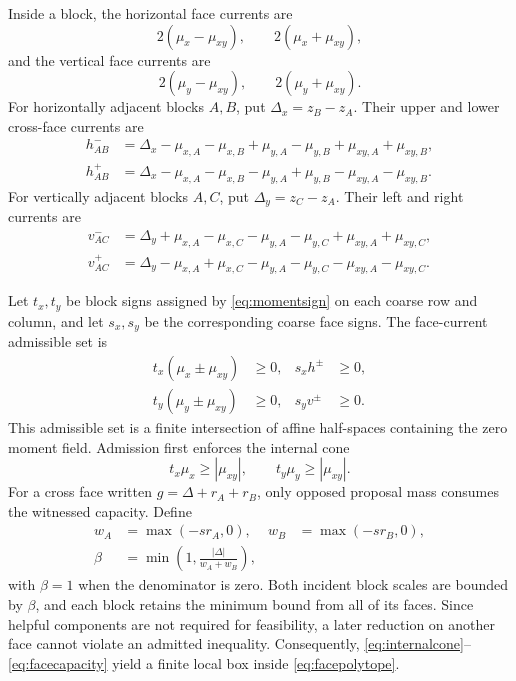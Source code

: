 Inside a block, the horizontal face currents are
\begin{equation}
 2(\mu_x-\mu_{xy}),\qquad2(\mu_x+\mu_{xy}),
 \label{eq:internalhorizontal}
\end{equation}
and the vertical face currents are
\begin{equation}
 2(\mu_y-\mu_{xy}),\qquad2(\mu_y+\mu_{xy}).
 \label{eq:internalvertical}
\end{equation}
For horizontally adjacent blocks \(A,B\), put \(\Delta_x=z_B-z_A\). Their
upper and lower cross-face currents are
\begin{align}
 h^-_{AB}&=\Delta_x-\mu_{x,A}-\mu_{x,B}
 +\mu_{y,A}-\mu_{y,B}+\mu_{xy,A}+\mu_{xy,B},\nonumber\\
 h^+_{AB}&=\Delta_x-\mu_{x,A}-\mu_{x,B}
 -\mu_{y,A}+\mu_{y,B}-\mu_{xy,A}-\mu_{xy,B}.
 \label{eq:horizontalfaces}
\end{align}
For vertically adjacent blocks \(A,C\), put \(\Delta_y=z_C-z_A\). Their
left and right currents are
\begin{align}
 v^-_{AC}&=\Delta_y+\mu_{x,A}-\mu_{x,C}
 -\mu_{y,A}-\mu_{y,C}+\mu_{xy,A}+\mu_{xy,C},\nonumber\\
 v^+_{AC}&=\Delta_y-\mu_{x,A}+\mu_{x,C}
 -\mu_{y,A}-\mu_{y,C}-\mu_{xy,A}-\mu_{xy,C}.
 \label{eq:verticalfaces}
\end{align}

Let \(t_x,t_y\) be block signs assigned by \eqref{eq:momentsign} on each
coarse row and column, and let \(s_x,s_y\) be the corresponding coarse face
signs. The face-current admissible set is
\begin{equation}
\begin{aligned}
 t_x(\mu_x\pm\mu_{xy})&\geq0,&s_xh^\pm&\geq0,\\
 t_y(\mu_y\pm\mu_{xy})&\geq0,&s_yv^\pm&\geq0.
\end{aligned}
 \label{eq:facepolytope}
\end{equation}
This admissible set is a finite intersection of affine half-spaces containing
the zero moment field. Admission first enforces the internal cone
\begin{equation}
 t_x\mu_x\geq|\mu_{xy}|,\qquad
 t_y\mu_y\geq|\mu_{xy}|.
 \label{eq:internalcone}
\end{equation}
For a cross face written \(g=\Delta+r_A+r_B\), only opposed proposal mass
consumes the witnessed capacity. Define
\begin{align}
 w_A&=\max(-sr_A,0),&w_B&=\max(-sr_B,0),\nonumber\\
 \beta&=\min\left(1,\frac{|\Delta|}{w_A+w_B}\right),
 \label{eq:facecapacity}
\end{align}
with \(\beta=1\) when the denominator is zero. Both incident block scales are
bounded by \(\beta\), and each block retains the minimum bound from all of its
faces. Since helpful components are not required for feasibility, a later
reduction on another face cannot violate an admitted inequality.
Consequently, \eqref{eq:internalcone}--\eqref{eq:facecapacity} yield a finite
local box inside \eqref{eq:facepolytope}.

